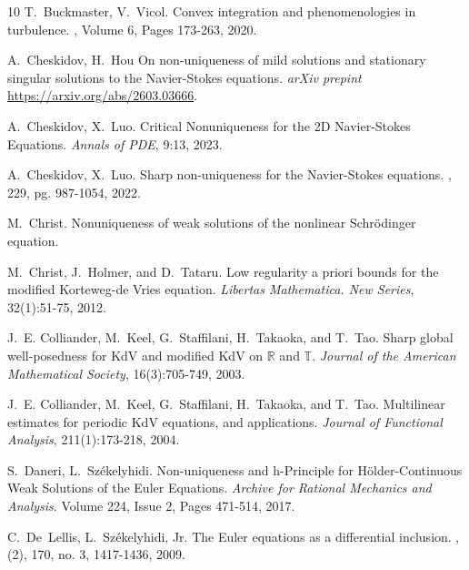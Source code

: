 \documentclass[12pt,reqno,letterpaper]{amsart}
\numberwithin{equation}{section}
\newcommand{\1}{{\bf 1}}
\newcommand{\2}{{\bf 2}}
\theoremstyle{remark}
\theoremstyle{remark}
\begin{document}
\begin{thebibliography}{10}
    T.~Buckmaster, V.~Vicol.
    \newblock Convex integration and phenomenologies in turbulence.
    , Volume 6, Pages 173-263, 2020.

    A.~Cheskidov, H.~Hou
    \newblock On non-uniqueness of mild solutions and stationary singular solutions to the Navier-Stokes equations.
    \newblock \emph{arXiv prepint} \url{https://arxiv.org/abs/2603.03666}.

     A.~Cheskidov, X.~Luo.
    \newblock Critical Nonuniqueness for the 2D Navier-Stokes Equations.
    \newblock \emph{Annals of PDE}, 9:13, 2023.

    A.~Cheskidov, X.~Luo.
    \newblock Sharp non-uniqueness for the Navier-Stokes equations.
    , 229, pg. 987-1054, 2022.

    M.~Christ.
    \newblock Nonuniqueness of weak solutions of the nonlinear Schr\"odinger equation.

    M.~Christ, J.~Holmer, and D.~Tataru.
    \newblock Low regularity a priori bounds for the modified
    Korteweg-de Vries equation.
    \newblock \emph{Libertas Mathematica. New Series},
    32(1):51-75, 2012.

    J.~E. Colliander, M.~Keel, G.~Staffilani, H.~Takaoka, and T.~Tao.
    \newblock Sharp global well-posedness for KdV and modified \textsf{KdV} on
    $\mathbb R$ and $\mathbb T$.
    \newblock \emph{Journal of the American Mathematical Society}, 16(3):705-749, 2003.

    J.~E. Colliander, M.~Keel, G.~Staffilani, H.~Takaoka, and T.~Tao.
    \newblock Multilinear estimates for periodic KdV equations, and applications.
    \newblock \emph{Journal of Functional Analysis}, 211(1):173-218, 2004.

    S.~Daneri, L.~Sz\'{e}kelyhidi.
    \newblock Non-uniqueness and h-Principle for Hölder-Continuous Weak
    Solutions of the Euler Equations.
    \newblock \emph{Archive for Rational Mechanics and Analysis}. Volume 224,
    Issue 2, Pages 471-514, 2017.

    C.~De~Lellis, L.~Sz\'ekelyhidi, Jr.
    \newblock The Euler equations as a differential inclusion.
    , (2), 170, no. 3, 1417-1436, 2009.
    

\end{thebibliography}
\end{document}
